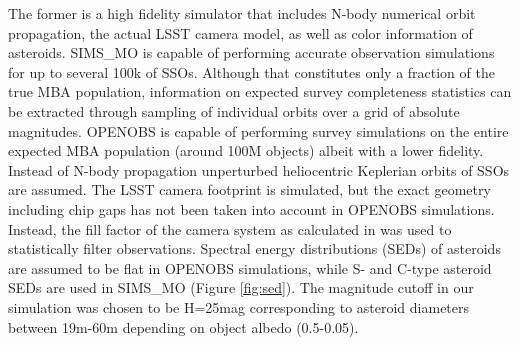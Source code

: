 The former is a high fidelity simulator that includes N-body numerical orbit propagation, the actual \gls{LSST} \gls{camera} model, as well as color information of asteroids. SIMS\_MO is capable of performing accurate observation simulations for up to several 100k of SSOs. Although that constitutes only a fraction of the true \gls{MBA} population, information on expected survey completeness statistics can be extracted through sampling of individual orbits over a grid of absolute magnitudes. 
OPENOBS is capable of performing survey simulations on the entire expected \gls{MBA} population (around 100M objects) albeit with a lower fidelity. Instead of N-body propagation unperturbed heliocentric Keplerian orbits of SSOs are assumed. The \gls{LSST} \gls{camera} \gls{footprint} is simulated, but the exact geometry including chip gaps has not been taken into account in OPENOBS simulations. Instead, the fill factor of the \gls{camera} system as calculated in \citet{veres2017high} was used to statistically filter observations. Spectral energy distributions (SEDs) of asteroids are assumed to be flat in OPENOBS simulations, while S- and C-type asteroid \gls{SED}s are used in SIMS\_MO (Figure \ref{fig:sed}). The magnitude cutoff in our simulation was chosen to be H=25mag corresponding to asteroid diameters between 19m-60m depending on object albedo (0.5-0.05).
